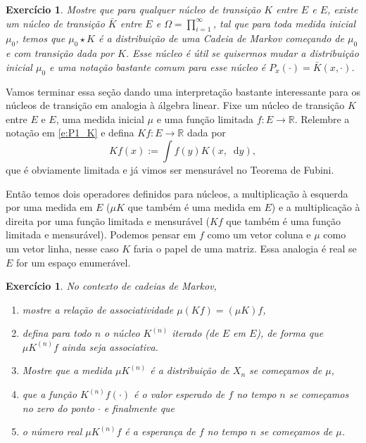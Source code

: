 \documentclass[reqno, draft]{book}
\newcommand*\1{\mathds{1}}
\newtheorem{exercise}[example]{Exercício}
\renewcommand*\d{\mathop{}\!\mathrm{d}}
\begin{document}
\begin{exercise}
  Mostre que para qualquer núcleo de transição $K$ entre $E$ e $E$, existe um núcleo de transição $\bar K$ entre $E$ e $\Omega = \prod_{i=1}^\infty$, tal que para toda medida inicial $\mu_0$, temos que $\mu_0 \star K$ é a distribuição de uma Cadeia de Markov começando de $\mu_0$ e com transição dada por $K$.
  Esse núcleo é útil se quisermos mudar a distribuição inicial $\mu_0$ e uma notação bastante comum para esse núcleo é $P_{x}(\cdot) = \bar K(x, \cdot)$.
\end{exercise}

Vamos terminar essa seção dando uma interpretação bastante interessante para os núcleos de transição em analogia à álgebra linear.
Fixe um núcleo de transição $K$ entre $E$ e $E$, uma medida inicial $\mu$ e uma função limitada $f: E \to \mathbb{R}$.
Relembre a notação em \eqref{e:P1_K} e defina $K f: E \to \mathbb{R}$ dada por
\begin{equation}
  K f(x):= \int f(y) K(x, \d y),
\end{equation}
que é obviamente limitada e já vimos ser mensurável no Teorema de Fubini.

Então temos dois operadores definidos para núcleos, a multiplicação à esquerda por uma medida em $E$ ($\mu K$ que também é uma medida em $E$) e a multiplicação à direita por uma função limitada e mensurável ($K f$ que também é uma função limitada e mensurável).
Podemos pensar em $f$ como um vetor coluna e $\mu$ como um vetor linha, nesse caso $K$ faria o papel de uma matriz.
Essa analogia é real se $E$ for um espaço enumerável.

\begin{exercise}
  No contexto de cadeias de Markov,
  \begin{enumerate}[\quad a)]
  \item mostre a relação de associatividade $\mu (K f) = (\mu K) f$,
  \item defina para todo $n$ o núcleo $K^{(n)}$ iterado (de $E$ em $E$), de forma que $\mu K^{(n)} f$ ainda seja associativa.
  \item Mostre que a medida $\mu K^{(n)}$ é a distribuição de $X_n$ se começamos de $\mu$,
  \item que a função $K^{(n)} f (\cdot)$ é o valor esperado de $f$ no tempo $n$ se começamos no zero do ponto $\cdot$ e finalmente que
  \item o número real $\mu K^{(n)} f$ é a esperança de $f$ no tempo $n$ se começamos de $\mu$.
  \end{enumerate}
\end{exercise}
\end{document}
